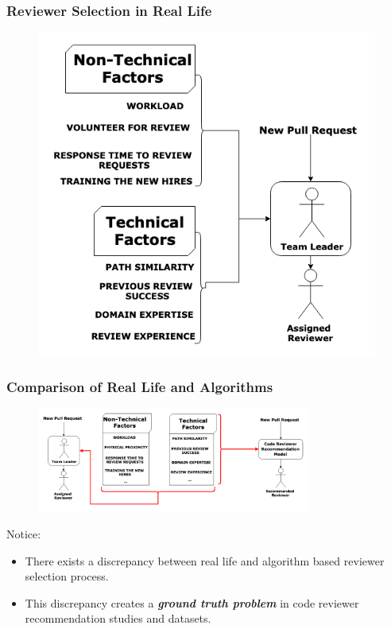 \documentclass{beamer}
\begin{document}
\begin{frame}
\frametitle{\large Reviewer Selection in Real Life }

  \begin{figure}
    \includegraphics[height=0.9\textheight]{img/real-life.png}
    \end{figure}

\end{frame}

\begin{frame}
\frametitle{\large Comparison of Real Life and Algorithms}

  \begin{figure}
    \includegraphics[width=0.8\textwidth]{img/reallife_vs_algos.png}
    \end{figure}
    \begin{alertblock}{Notice:}
        \begin{itemize}
        \item There exists a discrepancy between real life and algorithm based reviewer selection process.
        \item This discrepancy creates a \textbf{\textit{ground truth problem}} in code reviewer recommendation studies and datasets.
        \end{itemize}
    \end{alertblock}
\end{frame}
\end{document}
